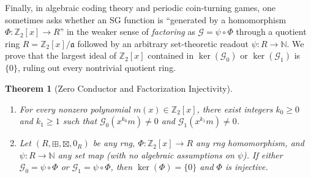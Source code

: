 \documentclass[11pt,a4paper]{article}
\newtheorem{theorem}{Theorem}[section]
\theoremstyle{definition}
\newcommand{\Z}{\mathbb{Z}}
\newcommand{\N}{\mathbb{N}}
\newcommand{\SG}{\mathcal{G}}
\begin{document}
Finally, in algebraic coding theory and periodic coin-turning games, one sometimes asks
whether an SG function is ``generated by a homomorphism $\Phi : \Z_2[x] \to R$'' in the
weaker sense of \emph{factoring} as $\SG = \psi \circ \Phi$ through a quotient ring
$R = \Z_2[x]/\mathfrak{a}$ followed by an arbitrary set-theoretic readout $\psi : R \to \N$.
We prove that the largest ideal of $\Z_2[x]$ contained in $\ker(\SG_0)$ or $\ker(\SG_1)$
is $\{0\}$, ruling out every nontrivial quotient ring.

\begin{theorem}[Zero Conductor and Factorization Injectivity]
\label{thm:zero-conductor}
\begin{enumerate}
  \setlength{\itemsep}{2pt}
  \item For every nonzero polynomial $m(x) \in \Z_2[x]$, there exist integers $k_0 \ge 0$
    and $k_1 \ge 1$ such that $\SG_0(x^{k_0} m) \neq 0$ and $\SG_1(x^{k_1} m) \neq 0$.
  \item Let $(R,\boxplus,\boxtimes,0_R)$ be any rng, $\Phi : \Z_2[x] \to R$ any rng
    homomorphism, and $\psi : R \to \N$ any set map (with no algebraic assumptions on
    $\psi$). If either $\SG_0 = \psi \circ \Phi$ or $\SG_1 = \psi \circ \Phi$, then
    $\ker(\Phi) = \{0\}$ and $\Phi$ is injective.
\end{enumerate}
\end{theorem}
\end{document}
